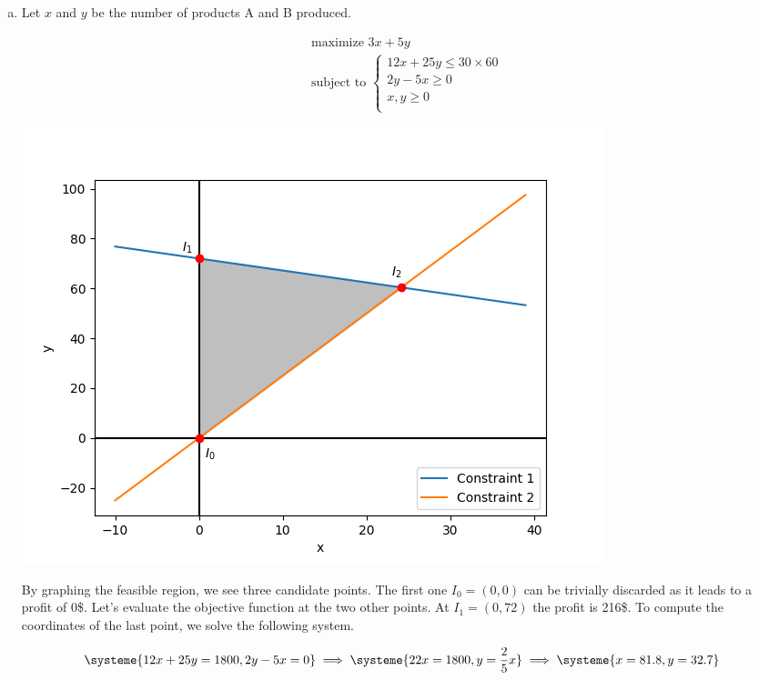 \documentclass[a4paper, 10pt, twoside]{article}
\begin{document}
\begin{enumerate}[a)]
    \item

          Let $x$ and $y$ be the number of products A and B produced.

          \begin{align*}
               & \text{maximize } 3x + 5y \\
               & \text{subject to }
              \begin{cases}
                  12 x + 25 y \le 30 \times 60 \\
                  2 y - 5 x \ge 0              \\
                  x,y \ge 0                                 \\
              \end{cases}
          \end{align*}

          \begin{center}
              \includegraphics[width = .5 \textwidth]{graph1.png}
          \end{center}

          By graphing the feasible region, we see three candidate points. The first one $I_0 = (0, 0)$ can be trivially discarded as it leads to a profit of 0\$. Let's evaluate the objective function at the two other points. At $I_1 = (0, 72)$ the profit is 216\$. To compute the coordinates of the last point, we solve the following system.

          \begin{align*}
              \systeme{
                  12 x + 25 y = 1800,
                  2 y - 5 x = 0
              }
              \implies
              \systeme{
                  22 x = 1800,
                  y = \frac{2}{5} x
              }
              \implies
              \systeme{
                  x = 81.8,
                  y = 32.7
              }
          \end{align*}


\end{enumerate}
\end{document}
